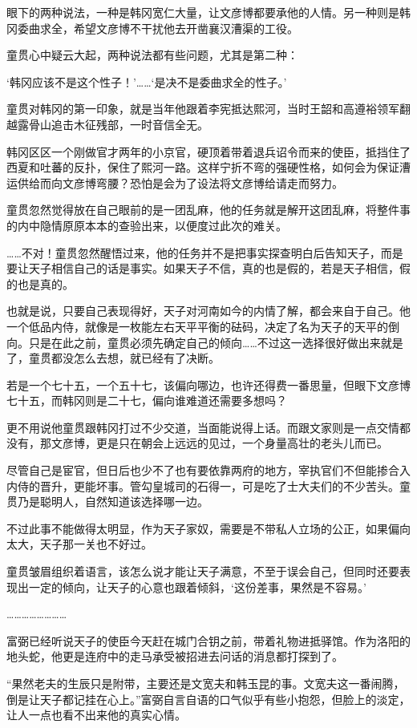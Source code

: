 眼下的两种说法，一种是韩冈宽仁大量，让文彦博都要承他的人情。另一种则是韩冈委曲求全，希望文彦博不干扰他去开凿襄汉漕渠的工役。

童贯心中疑云大起，两种说法都有些问题，尤其是第二种：

‘韩冈应该不是这个性子！’……‘是决不是委曲求全的性子。’

童贯对韩冈的第一印象，就是当年他跟着李宪抵达熙河，当时王韶和高遵裕领军翻越露骨山追击木征残部，一时音信全无。

韩冈区区一个刚做官才两年的小京官，硬顶着带着退兵诏令而来的使臣，抵挡住了西夏和吐蕃的反扑，保住了熙河一路。这样宁折不弯的强硬性格，如何会为保证漕运供给而向文彦博弯腰？恐怕是会为了设法将文彦博给请走而努力。

童贯忽然觉得放在自己眼前的是一团乱麻，他的任务就是解开这团乱麻，将整件事的内中隐情原原本本的查验出来，以便度过此次的难关。

……不对！童贯忽然醒悟过来，他的任务并不是把事实探查明白后告知天子，而是要让天子相信自己的话是事实。如果天子不信，真的也是假的，若是天子相信，假的也是真的。

也就是说，只要自己表现得好，天子对河南如今的内情了解，都会来自于自己。他一个低品内侍，就像是一枚能左右天平平衡的砝码，决定了名为天子的天平的倒向。只是在此之前，童贯必须先确定自己的倾向……不过这一选择很好做出来就是了，童贯都没怎么去想，就已经有了决断。

若是一个七十五，一个五十七，该偏向哪边，也许还得费一番思量，但眼下文彦博七十五，而韩冈则是二十七，偏向谁难道还需要多想吗？

更不用说他童贯跟韩冈打过不少交道，当面能说得上话。而跟文家则是一点交情都没有，那文彦博，更是只在朝会上远远的见过，一个身量高壮的老头儿而已。

尽管自己是宦官，但日后也少不了也有要依靠两府的地方，宰执官们不但能掺合入内侍的晋升，更能坏事。管勾皇城司的石得一，可是吃了士大夫们的不少苦头。童贯乃是聪明人，自然知道该选择哪一边。

不过此事不能做得太明显，作为天子家奴，需要是不带私人立场的公正，如果偏向太大，天子那一关也不好过。

童贯皱眉组织着语言，该怎么说才能让天子满意，不至于误会自己，但同时还要表现出一定的倾向，让天子的心意也跟着倾斜，‘这份差事，果然是不容易。’

……………………

富弼已经听说天子的使臣今天赶在城门合钥之前，带着礼物进抵驿馆。作为洛阳的地头蛇，他更是连府中的走马承受被招进去问话的消息都打探到了。

“果然老夫的生辰只是附带，主要还是文宽夫和韩玉昆的事。文宽夫这一番闹腾，倒是让天子都记挂在心上。”富弼自言自语的口气似乎有些小抱怨，但脸上的淡定，让人一点也看不出来他的真实心情。

